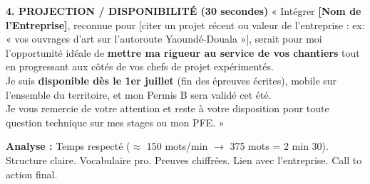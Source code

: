 \documentclass[11pt]{article}
\begin{document}
\begin{exoresolu}
\textbf{4. PROJECTION / DISPONIBILITÉ (30 secondes)}
« Intégrer \textbf{[Nom de l'Entreprise]}, reconnue pour [citer un projet récent ou valeur de l'entreprise : ex: « vos ouvrages d'art sur l'autoroute Yaoundé-Douala »], serait pour moi l'opportunité idéale de \textbf{mettre ma rigueur au service de vos chantiers} tout en progressant aux côtés de vos chefs de projet expérimentés. \\
Je suis \textbf{disponible dès le 1er juillet} (fin des épreuves écrites), mobile sur l'ensemble du territoire, et mon Permis B sera validé cet été. \\
Je vous remercie de votre attention et reste à votre disposition pour toute question technique sur mes stages ou mon PFE. »

\textbf{Analyse :} Temps respecté ($\approx$ 150 mots/min $\to$ 375 mots = 2 min 30). Structure claire. Vocabulaire pro. Preuves chiffrées. Lien avec l'entreprise. Call to action final.
\end{exoresolu}
\end{document}
